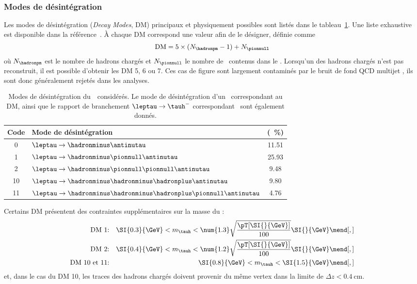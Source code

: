 \subsubsection{Modes de désintégration}
Les modes de désintégration (\emph{Decay Modes}, DM) principaux et physiquement possibles sont listés dans le tableau~\ref{tab-tauh-DMs}.
Une liste exhaustive est disponible dans la référence~\cite{PDG_booklet_2020}.
À chaque DM correspond une valeur afin de le désigner, définie comme
\begin{equation}
\text{DM} = 5\times(N_{\hadronpm}-1) + N_{\pionnull}
\end{equation}
où $N_{\hadronpm}$ est le nombre de hadrons chargés et $N_{\pionnull}$ le nombre de \pionnull\ contenus dans le \tauh.
Lorsqu'un des hadrons chargés n'est pas reconstruit, il est possible d'obtenir les DM 5, 6 ou 7.
Ces cas de figure sont largement contaminés par le bruit de fond \og QCD multijet \fg, ils sont donc généralement rejetés dans les analyses.
\begin{table}[h]
\centering
\begin{tabular}{clc}
\toprule
Code & Mode de désintégration & \BR{} (\SI{}{\%})\\
\midrule
0 & $\leptau\to \hadronminus \antinutau$ & \num{11.51} \\
1 & $\leptau\to \hadronminus \pionnull \antinutau$ & \num{25.93} \\
2 & $\leptau\to \hadronminus \pionnull\pionnull \antinutau$ & \num{9.48} \\
10 & $\leptau\to \hadronminus \hadronminus\hadronplus \antinutau$ & \num{9.80} \\
11 & $\leptau\to \hadronminus \hadronminus\hadronplus\pionnull\antinutau$ & \num{4.76} \\
\bottomrule
\end{tabular}
\caption[Modes de désintégration du~\tau\ considérés.]{Modes de désintégration du~\tau\ considérés. Le mode de désintégration d'un \leptau\ correspondant au DM, ainsi que le rapport de branchement $\leptau\to\tauh^-$ correspondant~\cite{PDG_booklet_2020} sont également donnés.}
\label{tab-tauh-DMs}
\end{table}
\par
Certains DM présentent des contraintes supplémentaires sur la masse du \tauh:
\begin{align*}
\text{DM 1:} && \SI{0.3}{\GeV} < m_{\tauh} < \num{1.3}\sqrt{\frac{\pT[\SI{}{\GeV}]}{100}} \SI{}{\GeV}\mend[,]\\
\text{DM 2:} && \SI{0.4}{\GeV} < m_{\tauh} < \num{1.2}\sqrt{\frac{\pT[\SI{}{\GeV}]}{100}} \SI{}{\GeV}\mend[,]\\
\text{DM 10 et 11:} && \SI{0.8}{\GeV} < m_{\tauh} < \SI{1.5}{\GeV}\mend[,]\\
\end{align*}
et, dans le cas du DM 10, les traces des hadrons chargés doivent provenir du même vertex dans la limite de $\Delta z < \SI{0.4}{\centi\meter}$.

